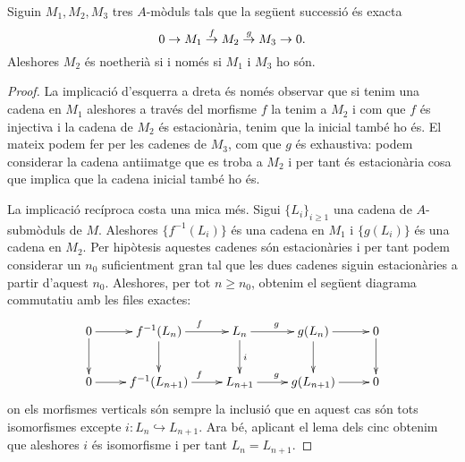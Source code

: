 \documentclass[../../../main.tex]{subfiles}
\begin{document}
\begin{prop}
\label{prop:noetheriaSuccessioExacta} Siguin $M_1,M_2,M_3$ tres $A$-mòduls tals que la següent successió és exacta
\begin{equation}
    \notag
    0\to M_1\overset{f}{\to}M_2\overset{g}{\to}M_3\to 0.
\end{equation}
Aleshores $M_2$ és noetherià si i només si $M_1$ i $M_3$ ho són.
\end{prop}
\begin{proof}
La implicació d'esquerra a dreta és només observar que si tenim una cadena en $M_1$ aleshores a través del morfisme $f$ la tenim a $M_2$ i com que $f$ és injectiva i la cadena de $M_2$ és estacionària, tenim que la inicial també ho és. El mateix podem fer per les cadenes de $M_3$, com que $g$ és exhaustiva: podem considerar la cadena antiimatge que es troba a $M_2$ i per tant és estacionària cosa que implica que la cadena inicial també ho és.

La implicació recíproca costa una mica més. Sigui $\{L_i\}_{i\geq 1}$ una cadena de $A$-submòduls de $M$. Aleshores $\{f^{-1}(L_i)\}$ és una cadena en $M_1$ i $\{g(L_i)\}$ és una cadena en $M_2$. Per hipòtesis aquestes cadenes són estacionàries i per tant podem considerar un $n_0$ suficientment gran tal que les dues cadenes siguin estacionàries a partir d'aquest $n_0$. Aleshores, per tot $n\geq n_0$, obtenim el següent diagrama commutatiu amb les files exactes:
\begin{equation}
    \notag
    \xymatrix{
    0\ar[r]\ar[d] & f^{-1}(L_n)\ar[r]^f\ar[d] & L_n\ar[r]^g\ar[d]^{i} & g(L_n)\ar[d]\ar[r] & 0 \ar[d] \\
    0\ar[r] & f^{-1}(L_{n+1})\ar[r]^f & L_{n+1}\ar[r]^g & g(L_{n+1})\ar[r] & 0
    }
\end{equation}
on els morfismes verticals són sempre la inclusió que en aquest cas són tots isomorfismes excepte $i:L_n\hookrightarrow L_{n+1}$. Ara bé, aplicant el lema dels cinc obtenim que aleshores $i$ és isomorfisme i per tant $L_n = L_{n+1}$.
\end{proof}
\end{document}
